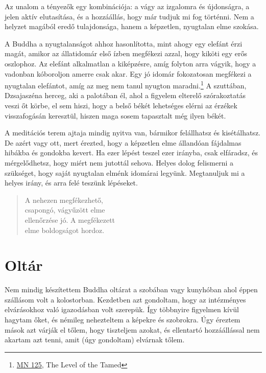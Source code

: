 Az unalom a tényezők egy kombinációja: a vágy az izgalomra és
újdonságra, a jelen aktív elutasítása, és a hozzáállás, hogy már tudjuk
mi fog történni. Nem a helyzet magából eredő tulajdonsága, hanem a
képzetlen, nyugtalan elme szokása.

A Buddha a nyugtalanságot ahhoz hasonlította, mint ahogy egy elefánt
érzi magát, amikor az állatidomár első ízben megfékezi azzal, hogy
kiköti egy erős oszlophoz. Az elefánt alkalmatlan a kiképzésre, amíg
folyton arra vágyik, hogy a vadonban kóboroljon amerre csak akar. Egy jó
idomár fokozatosan megfékezi a nyugtalan elefántot, amíg az meg nem
tanul nyugton maradni.\footnote{\href{https://suttacentral.net/mn125}{MN
  125}, The Level of the Tamed} A szuttában, Dzsajaszéna herceg, aki a
palotában él, ahol a figyelem elterelő szórakoztatás veszi őt körbe, el
sem hiszi, hogy a belső békét lehetséges elérni az érzékek visszafogásán
keresztül, hiszen maga sosem tapasztalt még ilyen békét.

A meditációs terem ajtaja mindig nyitva van, bármikor felállhatsz és
kisétálhatsz. De azért vagy ott, mert érezted, hogy a képzetlen elme
állandóan fájdalmas hibákba és gondokba kevert. Ha ezer lépést teszel
ezer irányba, csak elfáradsz, és mérgelődhetsz, hogy miért nem jutottál
sehova. Helyes dolog felismerni a szükséget, hogy saját nyugtalan elménk
idomárai legyünk. Megtanuljuk mi a helyes irány, és arra felé teszünk
lépéseket.

\begin{quote}
A nehezen megfékezhető,\\
csapongó, vágyűzött elme\\
ellenőrzése jó. A megfékezett\\
elme boldogságot hordoz.

\bigskip

\end{quote}

\section{Oltár}


\noindent Nem mindig készítettem Buddha oltárat a szobában vagy
kunyhóban ahol éppen szállásom volt a kolostorban. Kezdetben azt
gondoltam, hogy az intézményes elvárásokhoz való igazodásban volt
szerepük. Így többnyire figyelmen kívül hagytam őket, és némileg
nehezteltem a képekre és szobrokra. Úgy éreztem mások azt várják el
tőlem, hogy tiszteljem azokat, és ellentartó hozzáállással nem akartam
azt tenni, amit (úgy gondoltam) elvárnak tőlem.

